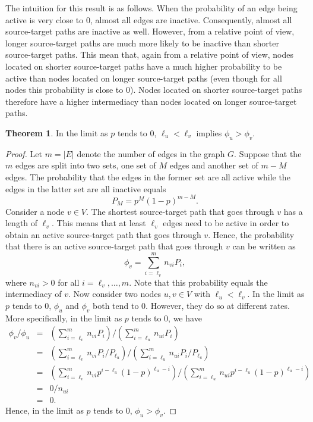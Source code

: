 \documentclass{article}
\theoremstyle{definition}
\newtheorem{theorem}{Theorem}
\begin{document}
The intuition for this result is as follows. When the probability of an edge being active is very close to $0$, almost all edges are inactive. Consequently, almost all source-target paths are inactive as well. However, from a relative point of view, longer source-target paths are much more likely to be inactive than shorter source-target paths. This mean that, again from a relative point of view, nodes located on shorter source-target paths have a much higher probability to be active than nodes located on longer source-target paths (even though for all nodes this probability is close to $0$). Nodes located on shorter source-target paths therefore have a higher intermediacy than nodes located on longer source-target paths.

\begin{theorem}
	In the limit as $p$ tends to $0$, $\ell_u < \ell_v$ implies $\phi_u > \phi_v$.
	\label{the:p0}
\end{theorem}

\begin{proof}
	Let $m = |E|$ denote the number of edges in the graph $G$. Suppose that the $m$ edges are split into two sets, one set of $M$ edges and another set of $m-M$ edges. The probability that the edges in the former set are all active while the edges in the latter set are all inactive equals
	$$P_M = p^M (1-p)^{m-M}.$$
	Consider a node $v \in V$. The shortest source-target path that goes through $v$ has a length of $\ell_v$. This means that at least $\ell_v$ edges need to be active in order to obtain an active source-target path that goes through $v$. Hence, the probability that there is an active source-target path that goes through $v$ can be written as
	$$\phi_v = \sum_{i = \ell_v}^m n_{vi} P_i,$$
	where $n_{vi} > 0$ for all $i = \ell_v,\dots,m$. Note that this probability equals the intermediacy of $v$.
	Now consider two nodes $u, v \in V$ with $\ell_u < \ell_v$. In the limit as $p$ tends to $0$, $\phi_u$ and $\phi_v$ both tend to $0$. However, they do so at different rates. More specifically, in the limit as $p$ tends to $0$, we have
	\begin{eqnarray}
		\phi_v / \phi_u & = & \left(\sum_{i = \ell_v}^m n_{vi} P_i\right) / \left(\sum_{i = \ell_u}^m n_{ui} P_i\right) \nonumber\\
		& = & \left(\sum_{i = \ell_v}^m n_{vi} P_i / P_{\ell_u}\right) / \left(\sum_{i = \ell_u}^m n_{ui} P_i / P_{\ell_u}\right) \nonumber\\
		& = & \left(\sum_{i = \ell_v}^m n_{vi} p^{i-\ell_u} (1-p)^{\ell_u-i}\right) / \left(\sum_{i = \ell_u}^m n_{ui} p^{i-\ell_u} (1-p)^{\ell_u-i}\right) \nonumber\\
		& = & 0 / n_{ui} \nonumber\\
		& = & 0.
	\end{eqnarray}
	Hence, in the limit as $p$ tends to $0$, $\phi_u > \phi_v$.
\end{proof}
\end{document}
